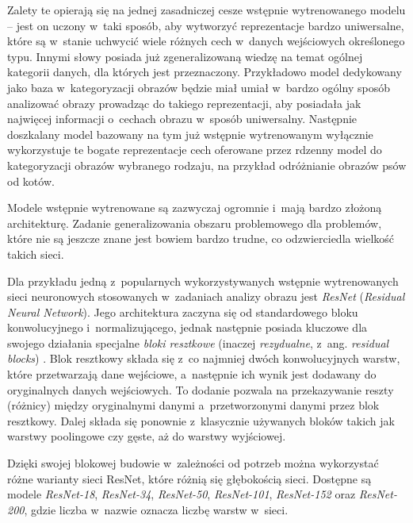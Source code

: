 Zalety te opierają się na jednej zasadniczej cesze wstępnie wytrenowanego modelu -- jest on uczony w~taki sposób, aby wytworzyć reprezentacje bardzo uniwersalne, które są w~stanie uchwycić wiele różnych cech w~danych wejściowych określonego typu.
Innymi słowy posiada już zgeneralizowaną wiedzę na temat ogólnej kategorii danych, dla których jest przeznaczony.
Przykładowo model dedykowany jako baza w~kategoryzacji obrazów będzie miał umiał w~bardzo ogólny sposób analizować obrazy prowadząc do takiego reprezentacji, aby posiadała jak najwięcej informacji o~cechach obrazu w~sposób uniwersalny.
Następnie doszkalany model bazowany na tym już wstępnie wytrenowanym wyłącznie wykorzystuje te bogate reprezentacje cech oferowane przez rdzenny model do kategoryzacji obrazów wybranego rodzaju, na przykład odróżnianie obrazów psów od kotów.

Modele wstępnie wytrenowane są zazwyczaj ogromnie i~mają bardzo złożoną architekturę.
Zadanie generalizowania obszaru problemowego dla problemów, które nie są jeszcze znane jest bowiem bardzo trudne, co odzwierciedla wielkość takich sieci.

Dla przykładu jedną z~popularnych wykorzystywanych wstępnie wytrenowanych sieci neuronowych stosowanych w~zadaniach analizy obrazu jest \emph{ResNet} (\emph{Residual Neural Network}).
Jego architektura zaczyna się od standardowego bloku konwolucyjnego i~normalizującego, jednak następnie posiada kluczowe dla swojego działania specjalne \emph{bloki resztkowe} (inaczej \emph{rezydualne}, z~ang. \emph{residual blocks}) \cite{li2016demystifying}.
Blok resztkowy składa się z~co najmniej dwóch konwolucyjnych warstw, które przetwarzają dane wejściowe, a~następnie ich wynik jest dodawany do oryginalnych danych wejściowych.
To dodanie pozwala na przekazywanie reszty (różnicy) między oryginalnymi danymi a~przetworzonymi danymi przez blok resztkowy.
Dalej składa się ponownie z~klasycznie używanych bloków takich jak warstwy poolingowe czy gęste, aż do warstwy wyjściowej.

Dzięki swojej blokowej budowie w~zależności od potrzeb można wykorzystać różne warianty sieci ResNet, które różnią się głębokością sieci.
Dostępne są modele \emph{ResNet-18}, \emph{ResNet-34}, \emph{ResNet-50}, \emph{ResNet-101}, \emph{ResNet-152} oraz \emph{ResNet-200}, gdzie liczba w~nazwie oznacza liczbę warstw w~sieci.
